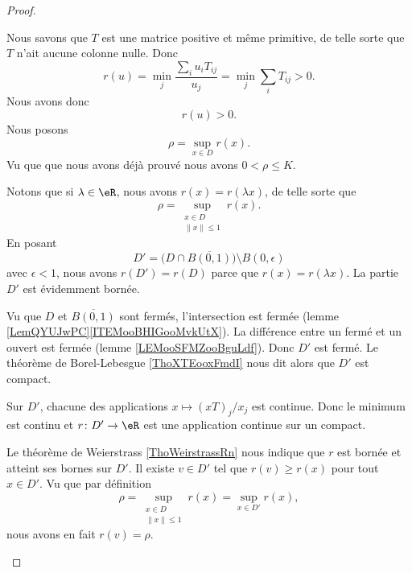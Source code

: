 \begin{proof}
\begin{subproof}
		Nous savons que \( T\) est une matrice positive et même primitive, de telle sorte que \( T\) n'ait aucune colonne nulle. Donc
		\begin{equation}
			r(u)=\min_j\frac{ \sum_iu_iT_{ij} }{ u_j }=\min_j\sum_iT_{ij}>0.
		\end{equation}
		Nous avons donc
		\begin{equation}
			r(u)>0.
		\end{equation}
		Nous posons
		\begin{equation}
			\rho=\sup_{x\in D}r(x).
		\end{equation}
		Vu que que nous avons déjà prouvé nous avons \( 0<\rho\leq K\).

		Notons que si \(\lambda\in \eR\), nous avons \( r(x)=r(\lambda x)\), de telle sorte que
		\begin{equation}
			\rho=\sup_{\substack{x\in D\\\| x \|\leq 1}}r(x).
		\end{equation}
		\spitem[Un compact]
		En posant
		\begin{equation}
			D'=\big( D\cap \overline{ B(0,1) } \big)\setminus B(0,\epsilon)
		\end{equation}
		avec \( \epsilon<1\), nous avons \( r(D')=r(D)\) parce que \( r(x)=r(\lambda x)\). La partie \( D'\) est évidemment bornée.

		Vu que \( D\) et \( \overline{ B(0,1) }\) sont fermés, l'intersection est fermée (lemme \ref{LemQYUJwPC}\ref{ITEMooBHIGooMvkUtX}). La différence entre un fermé et un ouvert est fermée (lemme \ref{LEMooSFMZooBguLdf}). Donc \( D'\) est fermé. Le théorème de Borel-Lebesgue \ref{ThoXTEooxFmdI} nous dit alors que \( D'\) est compact.

		Sur \( D'\), chacune des applications \( x\mapsto (xT)_j/x_j\) est continue. Donc le minimum est continu et \( r\colon D'\to \eR\) est une application continue sur un compact.

		\spitem[\( v\) et \( \rho\)]
		Le théorème de Weierstrass \ref{ThoWeirstrassRn} nous indique que \( r\) est bornée et atteint ses bornes sur \( D'\). Il existe \( v\in D'\) tel que \( r(v)\geq r(x)\) pour tout \( x\in D'\). Vu que par définition
		\begin{equation}
			\rho=\sup_{\substack{x\in D\\\| x \|\leq 1}}r(x)=\sup_{x\in D'}r(x),
		\end{equation}
		nous avons en fait \( r(v)=\rho\).


\end{subproof}
\end{proof}
